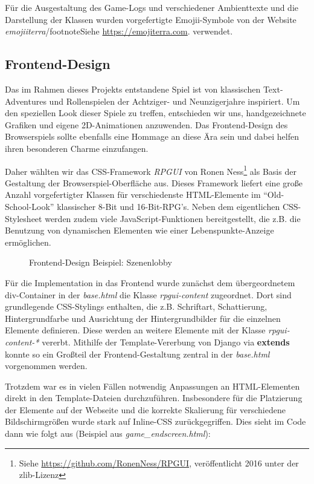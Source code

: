 Für die Ausgestaltung des Game-Logs und verschiedener Ambienttexte und die Darstellung der Klassen wurden vorgefertigte Emojii-Symbole von der Website \textit{emojiiterra}/footnote{Siehe \url{https://emojiterra.com}.} verwendet.

\pagebreak
\subsection{Frontend-Design}
Das im Rahmen dieses Projekts entstandene Spiel ist von klassischen Text-Adventures und Rollenspielen der Achtziger- und Neunzigerjahre inspiriert. Um den speziellen Look dieser Spiele zu treffen, entschieden wir uns, handgezeichnete Grafiken und eigene 2D-Animationen anzuwenden. Das Frontend-Design des Browserspiels sollte ebenfalls eine Hommage an diese Ära sein und dabei helfen ihren besonderen Charme einzufangen. 

Daher wählten wir das CSS-Framework \textit{RPGUI} von Ronen Ness\footnote{Siehe \url{https://github.com/RonenNess/RPGUI}, veröffentlicht 2016 unter der zlib-Lizenz} als Basis der Gestaltung der Browserspiel-Oberfläche aus. Dieses Framework liefert eine große Anzahl vorgefertigter Klassen für verschiedenste HTML-Elemente im \enquote{Old-School-Look} klassischer 8-Bit und 16-Bit-RPG's. Neben dem eigentlichen CSS-Stylesheet werden zudem viele JavaScript-Funktionen bereitgestellt, die z.B. die Benutzung von dynamischen Elementen wie einer Lebenspunkte-Anzeige ermöglichen.

\begin{figure}[H]
    \centering
    \caption{Frontend-Design Beispiel: Szenenlobby}
    \label{fig:frontend_rpgui_example}
\end{figure}

Für die Implementation in das Frontend wurde zunächst dem übergeordnetem div-Container in der \textit{base.html} die Klasse \textit{rpgui-content} zugeordnet. Dort sind grundlegende CSS-Stylings enthalten, die z.B. Schriftart, Schattierung, Hintergrundfarbe und Ausrichtung der Hintergrundbilder für die einzelnen Elemente definieren. Diese werden an weitere Elemente mit der Klasse \textit{rpgui-content-*} vererbt. Mithilfe der Template-Vererbung von Django via \textbf{extends} konnte so ein Großteil der Frontend-Gestaltung zentral in der \textit{base.html} vorgenommen werden.

Trotzdem war es in vielen Fällen notwendig Anpassungen an HTML-Elementen direkt in den Template-Dateien durchzuführen. Insbesondere für die Platzierung der Elemente auf der Webseite und die korrekte Skalierung für verschiedene Bildschirmgrößen wurde stark auf Inline-CSS zurückgegriffen. Dies sieht im Code dann wie folgt aus (Beispiel aus \textit{game\_endscreen.html}):

